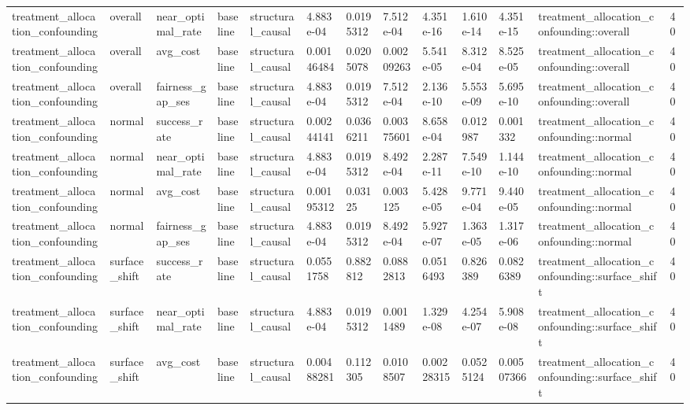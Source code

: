 \begin{tabular}{lllllllllllll}
treatment\_allocation\_confounding & overall & near\_optimal\_rate & baseline & structural\_causal & 4.883e-04 & 0.0195312 & 7.512e-04 & 4.351e-16 & 1.610e-14 & 4.351e-15 & treatment\_allocation\_confounding::overall & 40 \\
treatment\_allocation\_confounding & overall & avg\_cost & baseline & structural\_causal & 0.00146484 & 0.0205078 & 0.00209263 & 5.541e-05 & 8.312e-04 & 8.525e-05 & treatment\_allocation\_confounding::overall & 40 \\
treatment\_allocation\_confounding & overall & fairness\_gap\_ses & baseline & structural\_causal & 4.883e-04 & 0.0195312 & 7.512e-04 & 2.136e-10 & 5.553e-09 & 5.695e-10 & treatment\_allocation\_confounding::overall & 40 \\
treatment\_allocation\_confounding & normal & success\_rate & baseline & structural\_causal & 0.00244141 & 0.0366211 & 0.00375601 & 8.658e-04 & 0.012987 & 0.001332 & treatment\_allocation\_confounding::normal & 40 \\
treatment\_allocation\_confounding & normal & near\_optimal\_rate & baseline & structural\_causal & 4.883e-04 & 0.0195312 & 8.492e-04 & 2.287e-11 & 7.549e-10 & 1.144e-10 & treatment\_allocation\_confounding::normal & 40 \\
treatment\_allocation\_confounding & normal & avg\_cost & baseline & structural\_causal & 0.00195312 & 0.03125 & 0.003125 & 5.428e-05 & 9.771e-04 & 9.440e-05 & treatment\_allocation\_confounding::normal & 40 \\
treatment\_allocation\_confounding & normal & fairness\_gap\_ses & baseline & structural\_causal & 4.883e-04 & 0.0195312 & 8.492e-04 & 5.927e-07 & 1.363e-05 & 1.317e-06 & treatment\_allocation\_confounding::normal & 40 \\
treatment\_allocation\_confounding & surface\_shift & success\_rate & baseline & structural\_causal & 0.0551758 & 0.882812 & 0.0882813 & 0.0516493 & 0.826389 & 0.0826389 & treatment\_allocation\_confounding::surface\_shift & 40 \\
treatment\_allocation\_confounding & surface\_shift & near\_optimal\_rate & baseline & structural\_causal & 4.883e-04 & 0.0195312 & 0.0011489 & 1.329e-08 & 4.254e-07 & 5.908e-08 & treatment\_allocation\_confounding::surface\_shift & 40 \\
treatment\_allocation\_confounding & surface\_shift & avg\_cost & baseline & structural\_causal & 0.00488281 & 0.112305 & 0.0108507 & 0.00228315 & 0.0525124 & 0.00507366 & treatment\_allocation\_confounding::surface\_shift & 40 \\

\end{tabular}
